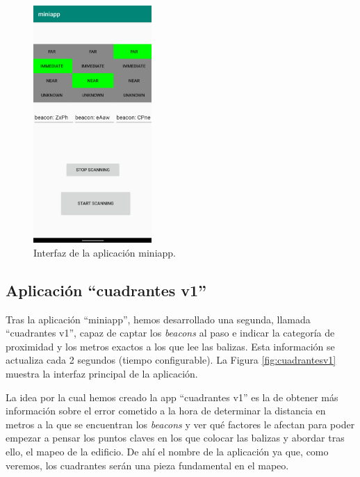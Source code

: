 \begin{figure}[t]
	\centering
	\includegraphics[width=0.4\textwidth]{Imagenes/Descripciondeltrabajo/miniapp}
	\caption{Interfaz de la aplicación miniapp. }
	\label{fig:miniapp}
\end{figure}

\subsection{Aplicación ``cuadrantes v1''}
Tras la aplicación ``miniapp'', hemos desarrollado una segunda, llamada ``cuadrantes v1'', capaz de captar los \textit{beacons} al paso e indicar la categoría de proximidad y los metros exactos a los que lee las balizas. Esta información se actualiza cada 2 segundos (tiempo configurable). La Figura \ref{fig:cuadrantesv1} muestra la interfaz principal de la aplicación.

La idea por la cual hemos creado la app ``cuadrantes v1'' es la de obtener más información sobre el error cometido a la hora de determinar la distancia en metros a la que se encuentran los \textit{beacons} y ver qué factores le afectan para poder empezar a pensar los puntos claves en los que colocar las balizas y abordar tras ello, el mapeo de la edificio. De ahí el nombre de la aplicación ya que, como veremos, los cuadrantes serán una pieza fundamental en el mapeo.

